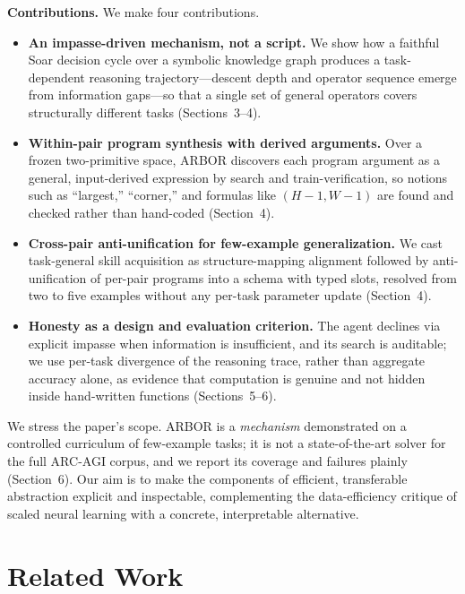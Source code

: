 \documentclass[letterpaper]{article} %
\begin{document}
\noindent\textbf{Contributions.} We make four contributions.
\begin{itemize}
\item \textbf{An impasse-driven mechanism, not a script.} We show how a faithful
Soar decision cycle over a symbolic knowledge graph produces a task-dependent
reasoning trajectory---descent depth and operator sequence emerge from
information gaps---so that a single set of general operators covers structurally
different tasks (Sections~3--4).
\item \textbf{Within-pair program synthesis with derived arguments.} Over a
frozen two-primitive space, ARBOR discovers each program argument as a general,
input-derived expression by search and train-verification, so notions such as
``largest,'' ``corner,'' and formulas like $(H-1,W-1)$ are found and checked
rather than hand-coded (Section~4).
\item \textbf{Cross-pair anti-unification for few-example generalization.} We
cast task-general skill acquisition as structure-mapping alignment followed by
anti-unification of per-pair programs into a schema with typed slots, resolved
from two to five examples without any per-task parameter update (Section~4).
\item \textbf{Honesty as a design and evaluation criterion.} The agent declines
via explicit impasse when information is insufficient, and its search is
auditable; we use per-task divergence of the reasoning trace, rather than
aggregate accuracy alone, as evidence that computation is genuine and not hidden
inside hand-written functions (Sections~5--6).
\end{itemize}

We stress the paper's scope. ARBOR is a \emph{mechanism} demonstrated on a
controlled curriculum of few-example tasks; it is not a state-of-the-art solver
for the full ARC-AGI corpus, and we report its coverage and failures plainly
(Section~6). Our aim is to make the components of efficient, transferable
abstraction explicit and inspectable, complementing the data-efficiency critique
of scaled neural learning with a concrete, interpretable alternative.

\section{Related Work}
\end{document}
